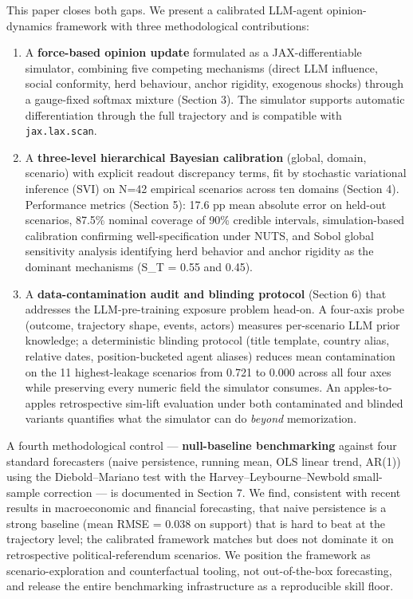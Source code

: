 \documentclass[
]{article}
\begin{document}
This paper closes both gaps. We present a calibrated LLM-agent
opinion-dynamics framework with three methodological contributions:

\begin{enumerate}
\def\labelenumi{\arabic{enumi}.}
\item
  A \textbf{force-based opinion update} formulated as a
  JAX-differentiable simulator, combining five competing mechanisms
  (direct LLM influence, social conformity, herd behaviour, anchor
  rigidity, exogenous shocks) through a gauge-fixed softmax mixture
  (Section 3). The simulator supports automatic differentiation through
  the full trajectory and is compatible with \texttt{jax.lax.scan}.
\item
  A \textbf{three-level hierarchical Bayesian calibration} (global,
  domain, scenario) with explicit readout discrepancy terms, fit by
  stochastic variational inference (SVI) on N=42 empirical scenarios
  across ten domains (Section 4). Performance metrics (Section 5): 17.6
  pp mean absolute error on held-out scenarios, 87.5\% nominal coverage
  of 90\% credible intervals, simulation-based calibration confirming
  well-specification under NUTS, and Sobol global sensitivity analysis
  identifying herd behavior and anchor rigidity as the dominant
  mechanisms (S\_T = 0.55 and 0.45).
\item
  A \textbf{data-contamination audit and blinding protocol} (Section 6)
  that addresses the LLM-pre-training exposure problem head-on. A
  four-axis probe (outcome, trajectory shape, events, actors) measures
  per-scenario LLM prior knowledge; a deterministic blinding protocol
  (title template, country alias, relative dates, position-bucketed
  agent aliases) reduces mean contamination on the 11 highest-leakage
  scenarios from 0.721 to 0.000 across all four axes while preserving
  every numeric field the simulator consumes. An apples-to-apples
  retrospective sim-lift evaluation under both contaminated and blinded
  variants quantifies what the simulator can do \emph{beyond}
  memorization.
\end{enumerate}

A fourth methodological control --- \textbf{null-baseline benchmarking}
against four standard forecasters (naive persistence, running mean, OLS
linear trend, AR(1)) using the Diebold--Mariano test with the
Harvey--Leybourne--Newbold small-sample correction --- is documented in
Section 7. We find, consistent with recent results in macroeconomic and
financial forecasting, that naive persistence is a strong baseline (mean
RMSE = 0.038 on support) that is hard to beat at the trajectory level;
the calibrated framework matches but does not dominate it on
retrospective political-referendum scenarios. We position the framework
as scenario-exploration and counterfactual tooling, not out-of-the-box
forecasting, and release the entire benchmarking infrastructure as a
reproducible skill floor.
\end{document}
